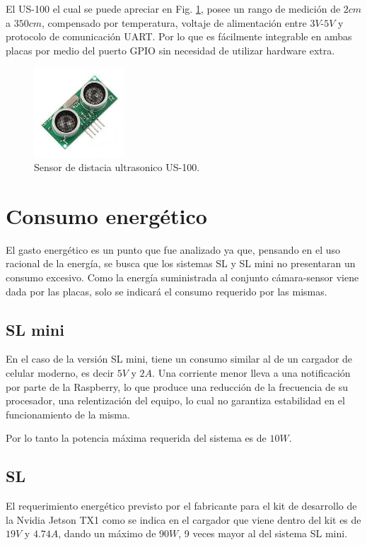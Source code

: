 El US-100 el cual se puede apreciar en Fig. \ref{fig:sensor-US100}, posee un rango de medición de $2cm$ a $350cm$, compensado por temperatura, voltaje de alimentación entre $3V$-$5V$ y protocolo de comunicación UART.
Por lo que es fácilmente integrable en ambas placas por medio del puerto GPIO sin necesidad de utilizar hardware extra.
\begin{figure}[bth]
    \centering
    \includegraphics[width=0.3\textwidth]{imgs/us-100.jpg}
    \caption{Sensor de distacia ultrasonico US-100.}
    \label{fig:sensor-US100}
\end{figure}

\section{Consumo energético}

El gasto energético es un punto que fue analizado ya que, pensando en el uso racional de la energía, se busca que los sistemas SL y SL mini no presentaran un consumo excesivo.
Como la energía suministrada al conjunto cámara-sensor viene dada por las placas, solo se indicará el consumo requerido por las mismas.


\subsection{SL mini}

En el caso de la versión SL mini, tiene un consumo similar al de un cargador de celular moderno, es decir $5V$ y
$2A$.
Una corriente menor lleva a una notificación por parte de la Raspberry, lo que produce una reducción de la frecuencia de su procesador, una relentización del equipo, lo cual no garantiza estabilidad en el funcionamiento de la misma.

Por lo tanto la potencia máxima requerida del sistema es de $10W$.

\subsection{SL}

El requerimiento energético previsto por el fabricante para el kit de desarrollo de la Nvidia Jetson TX1 como se indica
en el cargador que viene dentro del kit es de $19V$ y $4.74A$, dando un máximo de $90W$, 9 veces mayor al del sistema SL mini.

